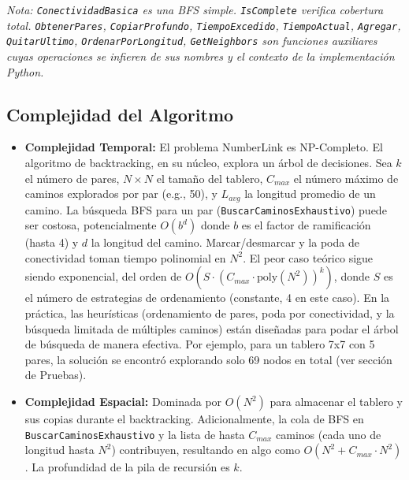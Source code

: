 \documentclass[spanish]{article}
\numberwithin{equation}{section}
\numberwithin{figure}{section}
\theoremstyle{definition}
\begin{document}
\textit{Nota: \texttt{ConectividadBasica} es una BFS simple. \texttt{IsComplete} verifica cobertura total. \texttt{ObtenerPares}, \texttt{CopiarProfundo}, \texttt{TiempoExcedido}, \texttt{TiempoActual}, \texttt{Agregar}, \texttt{QuitarUltimo}, \texttt{OrdenarPorLongitud}, \texttt{GetNeighbors} son funciones auxiliares cuyas operaciones se infieren de sus nombres y el contexto de la implementación Python.}

\subsection{Complejidad del Algoritmo}
\begin{itemize}
    \item \textbf{Complejidad Temporal:} El problema NumberLink es NP-Completo. El algoritmo de backtracking, en su núcleo, explora un árbol de decisiones. Sea $k$ el número de pares, $N \times N$ el tamaño del tablero, $C_{max}$ el número máximo de caminos explorados por par (e.g., 50), y $L_{avg}$ la longitud promedio de un camino. La búsqueda BFS para un par (\texttt{BuscarCaminosExhaustivo}) puede ser costosa, potencialmente $O(b^d)$ donde $b$ es el factor de ramificación (hasta 4) y $d$ la longitud del camino. Marcar/desmarcar y la poda de conectividad toman tiempo polinomial en $N^2$.
    El peor caso teórico sigue siendo exponencial, del orden de $O(S \cdot (C_{max} \cdot \text{poly}(N^2))^k)$, donde $S$ es el número de estrategias de ordenamiento (constante, 4 en este caso).
    En la práctica, las heurísticas (ordenamiento de pares, poda por conectividad, y la búsqueda limitada de múltiples caminos) están diseñadas para podar el árbol de búsqueda de manera efectiva. Por ejemplo, para un tablero 7x7 con 5 pares, la solución se encontró explorando solo 69 nodos en total (ver sección de Pruebas).

    \item \textbf{Complejidad Espacial:} Dominada por $O(N^2)$ para almacenar el tablero y sus copias durante el backtracking. Adicionalmente, la cola de BFS en \texttt{BuscarCaminosExhaustivo} y la lista de hasta $C_{max}$ caminos (cada uno de longitud hasta $N^2$) contribuyen, resultando en algo como $O(N^2 + C_{max} \cdot N^2)$. La profundidad de la pila de recursión es $k$.
\end{itemize}
\end{document}
